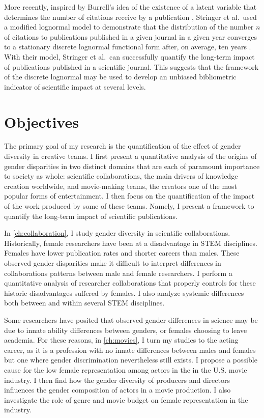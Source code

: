 More recently, inspired by Burrell's idea of the existence of a latent variable that determines the number of citations receive by a publication \cite{Burrell2001,Burrell2003a}, Stringer et al.\ used a modified lognormal model to demonstrate that the distribution of the number $n$ of citations to publications published in a given journal in a given year converges to a stationary discrete lognormal functional form after, on average, ten years \cite{Stringer2008,Stringer2010}. With their model, Stringer et al.\ can successfully quantify the long-term impact of publications published in a scientific journal. This suggests that the framework of the discrete lognormal may be used to develop an unbiased bibliometric indicator of scientific impact at several levels.


\section{Objectives}

The primary goal of my research is the quantification of the effect of gender diversity in creative teams. I first present a quantitative analysis of the origins of gender disparities in two distinct domains that are each of paramount importance to society as whole: scientific collaborations, the main drivers of knowledge creation worldwide, and movie-making teams, the creators one of the most popular forms of entertainment. I then focus on the quantification of the impact of the work produced by some of these teams. Namely, I present a framework to quantify the long-term impact of scientific publications.

In \autoref{ch:collaboration}, I study gender diversity in scientific collaborations. Historically, female researchers have been at a disadvantage in STEM disciplines. Females have lower publication rates and shorter careers than males. These observed gender disparities make it difficult to interpret differences in collaborations patterns between male and female researchers. I perform a quantitative analysis of researcher collaborations that properly controls for these historic disadvantages suffered by females. I also analyze systemic differences both between and within several STEM disciplines.

Some researchers have posited that observed gender differences in science may be due to innate ability differences between genders, or females choosing to leave academia. For these reasons, in \autoref{ch:movies}, I turn my studies to the acting career, as it is a profession with no innate differences between males and females but one where gender discrimination nevertheless still exists. I propose a possible cause for the low female representation among actors in the in the U.S. movie industry. I then find how the gender diversity of producers and directors influences the gender composition of actors in a movie production. I also investigate the role of genre and movie budget on female representation in the industry.

